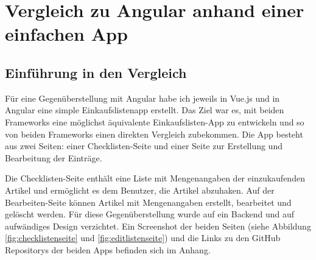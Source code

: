 

\chapter{Vergleich zu Angular anhand einer einfachen App}\label{ch:vergleich-zu-angular-anhand-einer-einfachen-app}


\section{Einführung in den Vergleich}
Für eine Gegenüberstellung mit Angular habe ich jeweils in Vue.js und in Angular eine
simple Einkaufslistenapp erstellt.
Das Ziel war es, mit beiden Frameworks eine möglichst äquivalente Einkaufslisten-App zu entwickeln und
so von beiden Frameworks einen direkten Vergleich zubekommen.
Die App besteht aus zwei Seiten: einer Checklisten-Seite und einer Seite zur Erstellung und Bearbeitung der Einträge.

Die Checklisten-Seite enthält eine Liste mit Mengenangaben der einzukaufenden Artikel und ermöglicht es dem Benutzer, die Artikel abzuhaken.
Auf der Bearbeiten-Seite können Artikel mit Mengenangaben erstellt, bearbeitet und gelöscht werden.
Für diese Gegenüberstellung wurde auf ein Backend und auf aufwändiges Design verzichtet.
Ein Screenshot der beiden Seiten (siehe Abbildung \ref{fig:checklistenseite} und \ref{fig:editlistenseite}) und die Links zu den GitHub Repositorys der beiden Apps befinden sich im Anhang.



